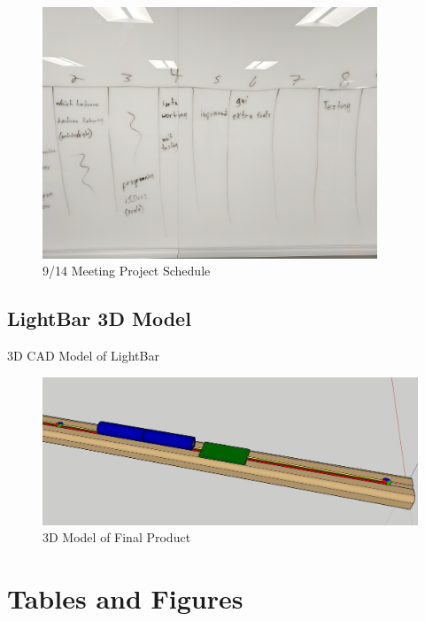 \documentclass[12pt]{article}
\begin{document}
{{{{			\begin{figure}[!htb]
				\centering
				\includegraphics[width=100mm]{assets/9-14_Project_Agenda_2.jpg}
				\caption{9/14 Meeting Project Schedule \label{overflow}}
			\end{figure}
	
		\subsection{LightBar 3D Model}
		3D CAD Model of LightBar
			\begin{figure}[ht!]
				\centering
				\includegraphics[width=170mm]{assets/Lightbar_Model.jpg}
				\caption{3D Model of Final Product \label{overflow}}
			\end{figure}

	\clearpage
	
	\section{Tables and Figures}
	
}}}}
\end{document}
